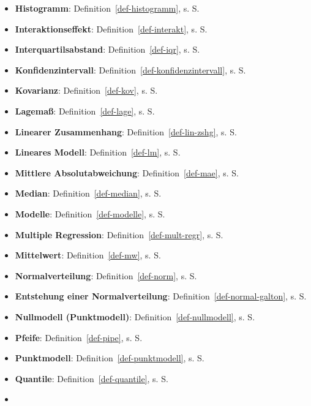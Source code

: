\documentclass[
  letterpaper,
  twoside,
  open=any]{scrbook}
\theoremstyle{definition}
\theoremstyle{definition}
\theoremstyle{definition}
\theoremstyle{remark}
\begin{document}
\begin{itemize}
  \pageref{def-gerade}
\item
  \textbf{Histogramm}: Definition~\ref{def-histogramm}, s. S.
  \pageref{def-histogramm}
\item
  \textbf{Interaktionseffekt}: Definition~\ref{def-interakt}, s. S.
  \pageref{def-interakt}
\item
  \textbf{Interquartilsabstand}: Definition~\ref{def-iqr}, s. S.
  \pageref{def-iqr}
\item
  \textbf{Konfidenzintervall}: Definition~\ref{def-konfidenzintervall},
  s. S. \pageref{def-konfidenzintervall}
\item
  \textbf{Kovarianz}: Definition~\ref{def-kov}, s. S. \pageref{def-kov}
\item
  \textbf{Lagemaß}: Definition~\ref{def-lage}, s. S. \pageref{def-lage}
\item
  \textbf{Linearer Zusammenhang}: Definition~\ref{def-lin-zshg}, s. S.
  \pageref{def-lin-zshg}
\item
  \textbf{Lineares Modell}: Definition~\ref{def-lm}, s. S.
  \pageref{def-lm}
\item
  \textbf{Mittlere Absolutabweichung}: Definition~\ref{def-mae}, s. S.
  \pageref{def-mae}
\item
  \textbf{Median}: Definition~\ref{def-median}, s. S.
  \pageref{def-median}
\item
  \textbf{Modelle}: Definition~\ref{def-modelle}, s. S.
  \pageref{def-modelle}
\item
  \textbf{Multiple Regression}: Definition~\ref{def-mult-regr}, s. S.
  \pageref{def-mult-regr}
\item
  \textbf{Mittelwert}: Definition~\ref{def-mw}, s. S. \pageref{def-mw}
\item
  \textbf{Normalverteilung}: Definition~\ref{def-norm}, s. S.
  \pageref{def-norm}
\item
  \textbf{Entstehung einer Normalverteilung}:
  Definition~\ref{def-normal-galton}, s. S. \pageref{def-normal-galton}
\item
  \textbf{Nullmodell (Punktmodell)}: Definition~\ref{def-nullmodell}, s.
  S. \pageref{def-nullmodell}
\item
  \textbf{Pfeife}: Definition~\ref{def-pipe}, s. S. \pageref{def-pipe}
\item
  \textbf{Punktmodell}: Definition~\ref{def-punktmodell}, s. S.
  \pageref{def-punktmodell}
\item
  \textbf{Quantile}: Definition~\ref{def-quantile}, s. S.
  \pageref{def-quantile}
\item

\end{itemize}
\end{document}
